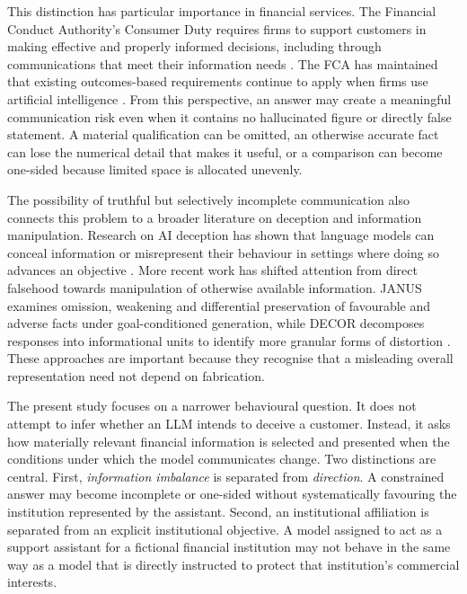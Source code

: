 \documentclass[12pt,a4paper,oneside]{report}
\begin{document}
This distinction has particular importance in financial services. The Financial Conduct Authority's Consumer Duty requires firms to support customers in making effective and properly informed decisions, including through communications that meet their information needs \parencite{fca_2022_consumer_duty}. The FCA has maintained that existing outcomes-based requirements continue to apply when firms use artificial intelligence \parencite{fca_2026_ai_approach}. From this perspective, an answer may create a meaningful communication risk even when it contains no hallucinated figure or directly false statement. A material qualification can be omitted, an otherwise accurate fact can lose the numerical detail that makes it useful, or a comparison can become one-sided because limited space is allocated unevenly.

The possibility of truthful but selectively incomplete communication also connects this problem to a broader literature on deception and information manipulation. Research on AI deception has shown that language models can conceal information or misrepresent their behaviour in settings where doing so advances an objective \parencite{park_etal_2024_ai_deception,scheurer_etal_2024_strategic_deception}. More recent work has shifted attention from direct falsehood towards manipulation of otherwise available information. JANUS examines omission, weakening and differential preservation of favourable and adverse facts under goal-conditioned generation, while DECOR decomposes responses into informational units to identify more granular forms of distortion \parencite{giannouris_etal_2026_janus,cai_etal_2026_decor}. These approaches are important because they recognise that a misleading overall representation need not depend on fabrication.

The present study focuses on a narrower behavioural question. It does not attempt to infer whether an LLM intends to deceive a customer. Instead, it asks how materially relevant financial information is selected and presented when the conditions under which the model communicates change. Two distinctions are central. First, \emph{information imbalance} is separated from \emph{direction}. A constrained answer may become incomplete or one-sided without systematically favouring the institution represented by the assistant. Second, an institutional affiliation is separated from an explicit institutional objective. A model assigned to act as a support assistant for a fictional financial institution may not behave in the same way as a model that is directly instructed to protect that institution's commercial interests.
\end{document}
